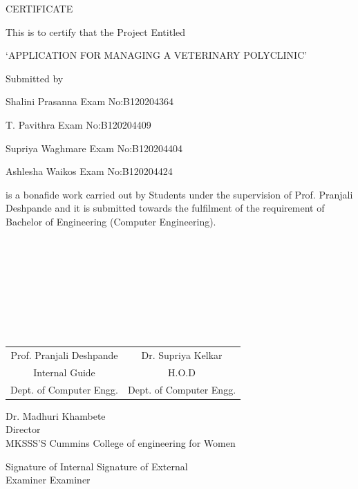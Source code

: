 \documentclass[oneside,a4paper,12pt]{book}
\newcommand\tab[1][1cm]{\hspace*{#1}}
\begin{document}
\newpage

{\bfseries \fontsize{16}{12} \selectfont \centerline{CERTIFICATE} 
\vspace*{4\baselineskip}} 

\centerline{This is to certify that the Project Entitled}
\vspace*{.5\baselineskip} 


{\bfseries \fontsize{14}{12} \selectfont \centerline{ `APPLICATION FOR MANAGING A VETERINARY POLYCLINIC'}
\vspace*{0.5\baselineskip}}

\centerline{Submitted by}
\vspace*{2\baselineskip} 
\centerline{Shalini Prasanna  \hspace{24 mm} Exam No:B120204364 } 
\centerline{T. Pavithra \hspace{34 mm} Exam No:B120204409  } 
\centerline{Supriya Waghmare \hspace{23 mm} Exam No:B120204404 }
\centerline{Ashlesha Waikos \hspace{25 mm} Exam No:B120204424 }
\vspace*{2\baselineskip}
is a bonafide work carried out by Students under the supervision of Prof. Pranjali Deshpande and it
is submitted towards the fulfilment of the requirement of Bachelor of Engineering (Computer Engineering).\\ \\ \\ \\ \\ \\ \\ \\ \\
\bgroup
\def\arraystretch{0.7}
\begin{tabular}{c c }

Prof. Pranjali Deshpande &  \hspace{50 mm} Dr. Supriya Kelkar \\								
Internal Guide   &  \hspace{50 mm} H.O.D \\
Dept. of Computer Engg.  &	\hspace{50 mm}Dept. of Computer Engg.  \\
\end{tabular}
\begin{center}
\vspace*{4\baselineskip}
{
Dr. Madhuri Khambete\\
Director\\
MKSSS'S Cummins College of engineering for Women  
}
\end{center}
\vspace*{4\baselineskip}
Signature of Internal \hspace{70 mm} Signature of External \\
\tab[1cm]Examiner	\tab[10cm]Examiner
\end{document}
